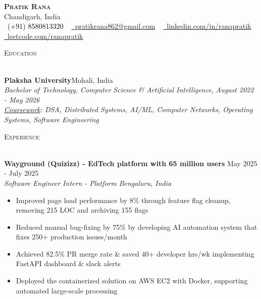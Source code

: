 \documentclass[a4paper]{article}
\newcommand{\tinyBulletSep} { \vspace{1.2mm} }
\newcommand{\bulletSep} { \vspace{1.5mm} }
\newcommand{\sectionSep} { \vspace{\stretch{1}} }
\newcommand{\lineunder} {
    \vspace*{-8pt} \\
    \hspace*{-15pt} \hrulefill \\
}
\newcommand{\header} [1] {
    {\hspace*{-18pt}\vspace*{6pt} {
        \fontfamily{qcs}\selectfont \large \scshape #1
    }}
    \vspace*{-6pt} \lineunder
    \vspace{1.1mm}
}
\newcommand{\educationItem}[6]{
    \textbf{#1}\hfill #2\\
    \textit{#3}, \textit{#4} \hfill \textit{#5}\\
    #6
}
\newcommand{\experienceItem}[5]{
    \textbf{#1} \hfill #2 \\
    \textit{#3} \hfill \textit{#4} \\
    #5
}
\begin{document}

\begin{center}
    {\textbf{\Huge \scshape Pratik Rana}} \\ \vspace{1pt}
    Chandigarh, India \\
    \small \textcolor{black}{\raisebox{-0.1\height}\faPhone\
        (+91) 8580813320} ~ \href{mailto:pratikrana862@gmail.com}{{\raisebox{-0.2\height}\faEnvelope\  \underline{pratikrana862@gmail.com}}} ~
    \href{https://www.linkedin.com/in/ranapratik/}{{\raisebox{-0.2\height}\faLinkedinSquare\ \underline{linkedin.com/in/ranapratik}}}  ~
    \href{https://leetcode.com/u/ranapratik/}{{\raisebox{-0.2\height}\faCode\ \underline{leetcode.com/ranapratik}}}
\end{center}

\vspace{-2mm}

\hypersetup {
    urlcolor     = blue, %
}


\header{Education}

\educationItem{Plaksha University}{Mohali, India}{Bachelor of Technology, Computer Science \& Artificial Intelligence}{}{August 2022 - May 2026}{
    \tinyBulletSep
    \textit{\underline{Coursework}: DSA, Distributed Systems, AI/ML, Computer Networks, Operating Systems, Software Engineering}
}

\sectionSep


\header{Experience}

\experienceItem{Wayground (Quizizz) - EdTech platform with 65 million users}{May 2025 - July 2025}{Software
Engineer Intern - Platform}{Bengaluru, India}{
    \begin{itemize}
    \item Improved page load performance by 8\% through feature flag cleanup, removing 215 LOC and archiving 155 flags
    \item Reduced manual bug-fixing by 75\% by developing AI automation system that fixes 250+ production issues/month
    \item Achieved 82.5\% PR merge rate \& saved 40+ developer hrs/wk implementing FastAPI dashboard \& slack alerts 
    

    \item Deployed the containerized solution on AWS EC2 with Docker, supporting automated large-scale processing
    \end{itemize}
}
\bulletSep
\end{document}
